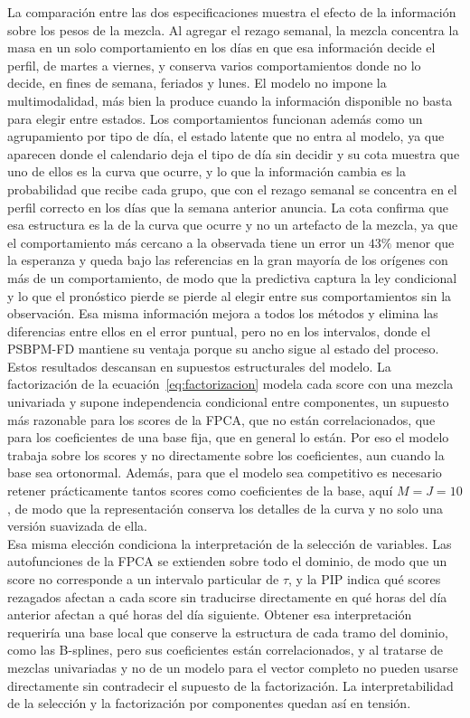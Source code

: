 La comparación entre las dos especificaciones muestra el efecto de la información sobre los pesos de la mezcla. Al agregar el rezago semanal, la mezcla concentra la masa en un solo comportamiento en los días en que esa información decide el perfil, de martes a viernes, y conserva varios comportamientos donde no lo decide, en fines de semana, feriados y lunes. El modelo no impone la multimodalidad, más bien la produce cuando la información disponible no basta para elegir entre estados. Los comportamientos funcionan además como un agrupamiento por tipo de día, el estado latente que no entra al modelo, ya que aparecen donde el calendario deja el tipo de día sin decidir y su cota muestra que uno de ellos es la curva que ocurre, y lo que la información cambia es la probabilidad que recibe cada grupo, que con el rezago semanal se concentra en el perfil correcto en los días que la semana anterior anuncia. La cota confirma que esa estructura es la de la curva que ocurre y no un artefacto de la mezcla, ya que el comportamiento más cercano a la observada tiene un error un $43\%$ menor que la esperanza y queda bajo las referencias en la gran mayoría de los orígenes con más de un comportamiento, de modo que la predictiva captura la ley condicional y lo que el pronóstico pierde se pierde al elegir entre sus comportamientos sin la observación. Esa misma información mejora a todos los métodos y elimina las diferencias entre ellos en el error puntual, pero no en los intervalos, donde el PSBPM-FD mantiene su ventaja porque su ancho sigue al estado del proceso.\\

Estos resultados descansan en supuestos estructurales del modelo. La factorización de la ecuación~\eqref{eq:factorizacion} modela cada score con una mezcla univariada y supone independencia condicional entre componentes, un supuesto más razonable para los scores de la FPCA, que no están correlacionados, que para los coeficientes de una base fija, que en general lo están. Por eso el modelo trabaja sobre los scores y no directamente sobre los coeficientes, aun cuando la base sea ortonormal. Además, para que el modelo sea competitivo es necesario retener prácticamente tantos scores como coeficientes de la base, aquí $M = J = 10$, de modo que la representación conserva los detalles de la curva y no solo una versión suavizada de ella.\\

Esa misma elección condiciona la interpretación de la selección de variables. Las autofunciones de la FPCA se extienden sobre todo el dominio, de modo que un score no corresponde a un intervalo particular de $\tau$, y la PIP indica qué scores rezagados afectan a cada score sin traducirse directamente en qué horas del día anterior afectan a qué horas del día siguiente. Obtener esa interpretación requeriría una base local que conserve la estructura de cada tramo del dominio, como las B-splines, pero sus coeficientes están correlacionados, y al tratarse de mezclas univariadas y no de un modelo para el vector completo no pueden usarse directamente sin contradecir el supuesto de la factorización. La interpretabilidad de la selección y la factorización por componentes quedan así en tensión.\\

